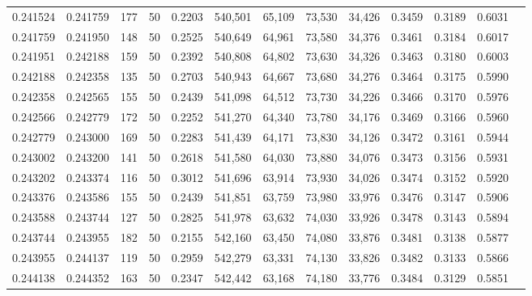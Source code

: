 \begin{tabular}{rrrrrrrrrrrrr}
0.241524 & 0.241759 &   177 &  50 &                                     0.2203 & 540,501 &  65,109 &  73,530 &  34,426 & 0.3459 & 0.3189 & 0.6031 \\
0.241759 & 0.241950 &   148 &  50 &                                     0.2525 & 540,649 &  64,961 &  73,580 &  34,376 & 0.3461 & 0.3184 & 0.6017 \\
0.241951 & 0.242188 &   159 &  50 &                                     0.2392 & 540,808 &  64,802 &  73,630 &  34,326 & 0.3463 & 0.3180 & 0.6003 \\
0.242188 & 0.242358 &   135 &  50 &                                     0.2703 & 540,943 &  64,667 &  73,680 &  34,276 & 0.3464 & 0.3175 & 0.5990 \\
0.242358 & 0.242565 &   155 &  50 &                                     0.2439 & 541,098 &  64,512 &  73,730 &  34,226 & 0.3466 & 0.3170 & 0.5976 \\
0.242566 & 0.242779 &   172 &  50 &                                     0.2252 & 541,270 &  64,340 &  73,780 &  34,176 & 0.3469 & 0.3166 & 0.5960 \\
0.242779 & 0.243000 &   169 &  50 &                                     0.2283 & 541,439 &  64,171 &  73,830 &  34,126 & 0.3472 & 0.3161 & 0.5944 \\
0.243002 & 0.243200 &   141 &  50 &                                     0.2618 & 541,580 &  64,030 &  73,880 &  34,076 & 0.3473 & 0.3156 & 0.5931 \\
0.243202 & 0.243374 &   116 &  50 &                                     0.3012 & 541,696 &  63,914 &  73,930 &  34,026 & 0.3474 & 0.3152 & 0.5920 \\
0.243376 & 0.243586 &   155 &  50 &                                     0.2439 & 541,851 &  63,759 &  73,980 &  33,976 & 0.3476 & 0.3147 & 0.5906 \\
0.243588 & 0.243744 &   127 &  50 &                                     0.2825 & 541,978 &  63,632 &  74,030 &  33,926 & 0.3478 & 0.3143 & 0.5894 \\
0.243744 & 0.243955 &   182 &  50 &                                     0.2155 & 542,160 &  63,450 &  74,080 &  33,876 & 0.3481 & 0.3138 & 0.5877 \\
0.243955 & 0.244137 &   119 &  50 &                                     0.2959 & 542,279 &  63,331 &  74,130 &  33,826 & 0.3482 & 0.3133 & 0.5866 \\
0.244138 & 0.244352 &   163 &  50 &                                     0.2347 & 542,442 &  63,168 &  74,180 &  33,776 & 0.3484 & 0.3129 & 0.5851 \\

\end{tabular}
